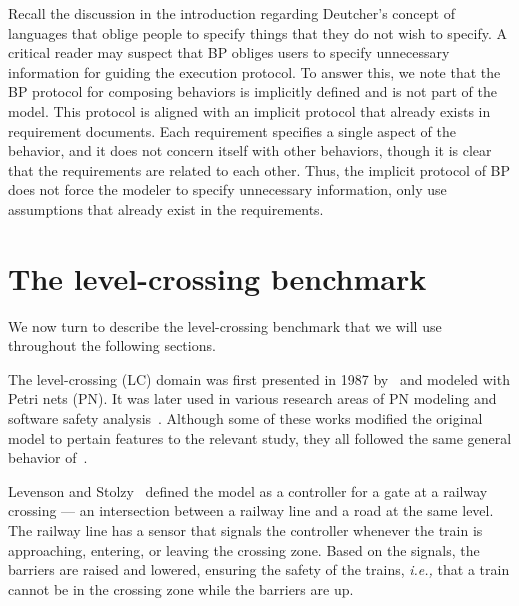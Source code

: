 \documentclass[10pt,journal,compsoc]{IEEEtran}
\theoremstyle{definition}
\newcommand{\ie}{\emph{i.e.,}\xspace}
\begin{document}
Recall the discussion in the introduction regarding Deutcher's concept of languages that oblige people to specify things that they do not wish to specify. A critical reader may suspect that BP obliges users to specify unnecessary information for guiding the execution protocol. To answer this, we note that the BP protocol for composing behaviors is implicitly defined and is not part of the model. This protocol is aligned with an implicit protocol that already exists in requirement documents. Each requirement specifies a single aspect of the behavior, and it does not concern itself with other behaviors, though it is clear that the requirements are related to each other. Thus, the implicit protocol of BP does not force the modeler to specify unnecessary information, only use assumptions that already exist in the requirements.


\section{The level-crossing benchmark}
\label{sec:lc-benchmark}
We now turn to describe the level-crossing benchmark that we will use throughout the following sections. 

The level-crossing (LC) domain was first presented in 1987 by~\cite{leveson1987safety} and modeled with Petri nets (PN). It was later used in various research areas of PN modeling and software safety analysis~\cite{liu2014penda, ghazel2016customizable, mazzeo1997systematic}. Although some of these works modified the original model to pertain features to the relevant study, they all followed the same general behavior of~\cite{leveson1987safety}. 

Levenson and Stolzy~\cite{leveson1987safety} defined the model as a controller for a gate at a railway crossing --- an intersection between a railway line and a road at the same level. The railway line has a sensor that signals the controller whenever the train is approaching, entering, or leaving the crossing zone. Based on the signals, the barriers are raised and lowered, ensuring the safety of the trains, \ie that a train cannot be in the crossing zone while the barriers are up. 
\end{document}
